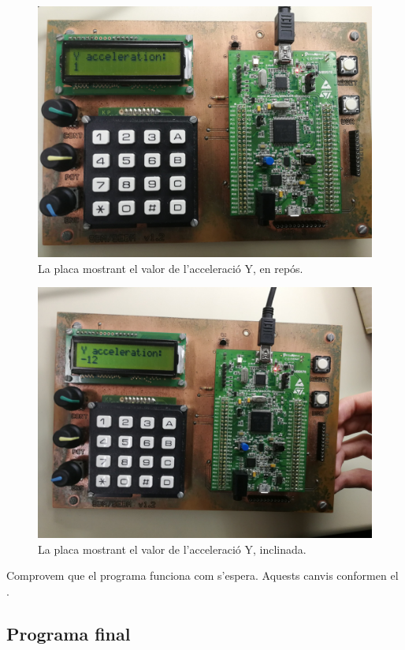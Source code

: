 \begin{figure}[p] %
  \includegraphics[width=.82\columnwidth]{../photos/board/p3-reading-initial_2}
  \caption{ \label{fig:p3-board-reading-initial} La placa mostrant el valor de l'acceleració Y, en repós. }
\end{figure}
\begin{figure}[p]
  \includegraphics[width=.82\columnwidth]{../photos/board/p3-reading-tilt_2}
  \caption{ \label{fig:p3-board-reading-tilt} La placa mostrant el valor de l'acceleració Y, inclinada. }
\end{figure}

Comprovem que el programa funciona com s'espera. Aquests canvis conformen el
.


\subsection{Programa final}

